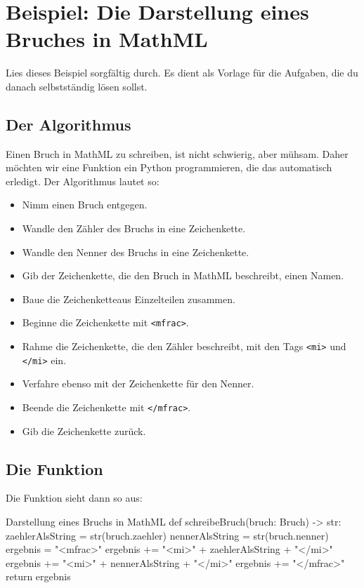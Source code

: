 \section{Beispiel: Die Darstellung eines Bruches in MathML}
\label{sec:BruchMathML}

Lies dieses Beispiel sorgfältig durch. Es dient als Vorlage für die Aufgaben, die du danach selbstständig lösen sollst.

\subsection{Der Algorithmus}

Einen Bruch in MathML zu schreiben, ist nicht schwierig, aber mühsam. Daher möchten wir eine Funktion ein Python programmieren, die das automatisch erledigt. Der Algorithmus lautet so:
\begin{itemize}
	\item Nimm einen Bruch entgegen.
	\item Wandle den Zähler des Bruchs in eine Zeichenkette.
	\item Wandle den Nenner des Bruchs in eine Zeichenkette.
	\item Gib der Zeichenkette, die den Bruch in MathML beschreibt, einen Namen.
	\item Baue die Zeichenketteaus Einzelteilen zusammen.
	\item Beginne die Zeichenkette mit \texttt{<mfrac>}.
	\item Rahme die Zeichenkette, die den Zähler beschreibt, mit den Tags \texttt{<mi>} und \texttt{</mi>} ein.
	\item Verfahre ebenso mit der Zeichenkette für den Nenner.
	\item Beende die Zeichenkette mit \texttt{</mfrac>}.
	\item Gib die Zeichenkette zurück.
\end{itemize}

\subsection{Die Funktion}

Die Funktion sieht dann so aus:

\begin{codePython}{Darstellung eines Bruchs in MathML}
def schreibeBruch(bruch: Bruch) -> str:
	zaehlerAlsString = str(bruch.zaehler)
	nennerAlsString = str(bruch.nenner)
	ergebnis = "<mfrac>"
	ergebnis += "<mi>" + zaehlerAlsString + "</mi>"
	ergebnis += "<mi>" + nennerAlsString + "</mi>"
	ergebnis += "</mfrac>"
	return ergebnis
\end{codePython}

